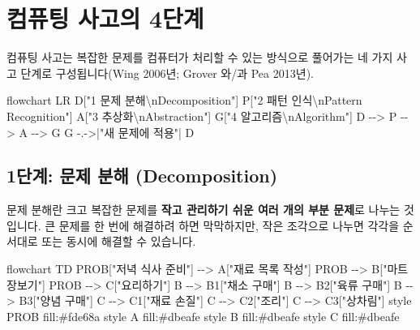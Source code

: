 \documentclass[
  korean,
  11pt,
  a4paper,
  DIV=11,
  numbers=noendperiod]{scrreprt}
\newenvironment{Shaded}{\begin{snugshade}}{\end{snugshade}}
\newcommand{\NormalTok}[1]{\textcolor[rgb]{0.00,0.23,0.31}{#1}}
\begin{document}
\section{컴퓨팅 사고의 4단계}\label{sec-ct-4steps}

컴퓨팅 사고는 복잡한 문제를 컴퓨터가 처리할 수 있는 방식으로 풀어가는 네
가지 사고 단계로 구성됩니다(Wing 2006년; Grover 와/과 Pea 2013년).

\begin{Shaded}
\begin{Highlighting}[]
\NormalTok{flowchart LR}
\NormalTok{    D["1 문제 분해\textbackslash{}nDecomposition"]}
\NormalTok{    P["2 패턴 인식\textbackslash{}nPattern Recognition"]}
\NormalTok{    A["3 추상화\textbackslash{}nAbstraction"]}
\NormalTok{    G["4 알고리즘\textbackslash{}nAlgorithm"]}
\NormalTok{    D {-}{-}\textgreater{} P {-}{-}\textgreater{} A {-}{-}\textgreater{} G}
\NormalTok{    G {-}.{-}\textgreater{}|"새 문제에 적용"| D}
\end{Highlighting}
\end{Shaded}

\subsection{1단계: 문제 분해
(Decomposition)}\label{uxb2e8uxacc4-uxbb38uxc81c-uxbd84uxd574-decomposition}

{문제 분해}란 크고 복잡한 문제를 \textbf{작고 관리하기 쉬운 여러 개의
부분 문제}로 나누는 것입니다. 큰 문제를 한 번에 해결하려 하면
막막하지만, 작은 조각으로 나누면 각각을 순서대로 또는 동시에 해결할 수
있습니다.

\begin{Shaded}
\begin{Highlighting}[]
\NormalTok{flowchart TD}
\NormalTok{    PROB["저녁 식사 준비"] {-}{-}\textgreater{} A["재료 목록 작성"]}
\NormalTok{    PROB {-}{-}\textgreater{} B["마트 장보기"]}
\NormalTok{    PROB {-}{-}\textgreater{} C["요리하기"]}
\NormalTok{    B {-}{-}\textgreater{} B1["채소 구매"]}
\NormalTok{    B {-}{-}\textgreater{} B2["육류 구매"]}
\NormalTok{    B {-}{-}\textgreater{} B3["양념 구매"]}
\NormalTok{    C {-}{-}\textgreater{} C1["재료 손질"]}
\NormalTok{    C {-}{-}\textgreater{} C2["조리"]}
\NormalTok{    C {-}{-}\textgreater{} C3["상차림"]}
\NormalTok{    style PROB fill:\#fde68a}
\NormalTok{    style A fill:\#dbeafe}
\NormalTok{    style B fill:\#dbeafe}
\NormalTok{    style C fill:\#dbeafe}
\end{Highlighting}
\end{Shaded}
\end{document}
